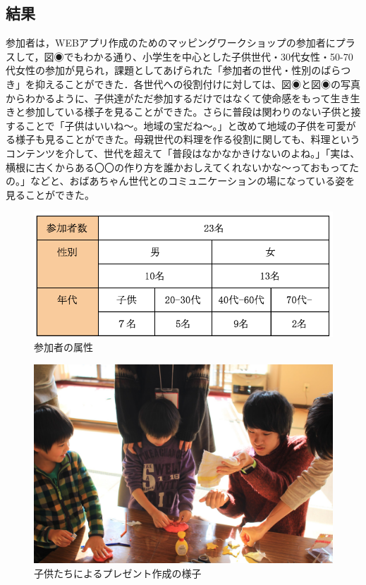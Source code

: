 \documentclass[a4paper]{jsarticle}
\begin{document}
\subsection{結果}
参加者は，WEBアプリ作成のためのマッピングワークショップの参加者にプラスして，図◉でもわかる通り、小学生を中心とした子供世代・30代女性・50-70代女性の参加が見られ，課題としてあげられた「参加者の世代・性別のばらつき」を抑えることができた．各世代への役割付けに対しては、図◉と図◉の写真からわかるように、子供達がただ参加するだけではなくて使命感をもって生き生きと参加している様子を見ることができた。さらに普段は関わりのない子供と接することで「子供はいいね〜。地域の宝だね〜。」と改めて地域の子供を可愛がる様子も見ることができた。母親世代の料理を作る役割に関しても、料理というコンテンツを介して、世代を超えて「普段はなかなかきけないのよね。」「実は、横根に古くからある〇〇の作り方を誰かおしえてくれないかな〜っておもってたの。」などと、おばあちゃん世代とのコミュニケーションの場になっている姿を見ることができた。
\begin{figure}[H]
  \begin{center}
    \includegraphics[width=0.7\hsize]{./images/20.png}
    \caption{参加者の属性}
    \label{fig:tmu_hino}
  \end{center}
\end{figure}
\begin{figure}[H]
\begin{center}
  \includegraphics[width=0.95\hsize]{./images/IMG_5929.JPG}
  \caption{子供たちによるプレゼント作成の様子}
  \label{chirstmas2}
\end{center}
\end{figure}
\end{document}

